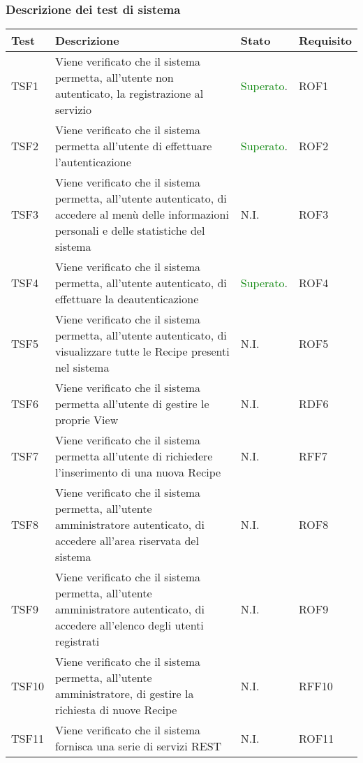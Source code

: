 		\subsubsection{Descrizione dei test di sistema}
			\begin{center}

			\def\arraystretch{1.5}
			\bgroup
			\begin{longtable}{| p{2cm} | p{7cm} | p{1.5cm} | p{2cm} |}
					\hline
					\textbf{Test} & \textbf{Descrizione} & \textbf{Stato} & \textbf{Requisito}\\
					\hline						
					TSF1 & Viene verificato che il sistema permetta, all'utente non autenticato, la registrazione al servizio & \textcolor{green}{Superato}. & ROF1\\
					\hline
					TSF2 & Viene verificato che il sistema permetta all'utente di effettuare l'autenticazione & \textcolor{green}{Superato}. & ROF2\\
					\hline
					TSF3 & Viene verificato che il sistema permetta, all'utente autenticato, di accedere al menù delle informazioni personali e delle statistiche del sistema & N.I. & ROF3\\
					\hline
					TSF4 & Viene verificato che il sistema permetta, all'utente autenticato, di effettuare la deautenticazione & \textcolor{green}{Superato}. & ROF4\\
					\hline
					TSF5 & Viene verificato che il sistema permetta, all'utente autenticato, di visualizzare tutte le Recipe presenti nel sistema & N.I. & ROF5\\
					\hline
					TSF6 & Viene verificato che il sistema permetta all'utente di gestire le proprie View & N.I. & RDF6\\
					\hline
					TSF7 & Viene verificato che il sistema permetta all'utente di richiedere l'inserimento di una nuova Recipe & N.I. & RFF7\\
					\hline
					TSF8 & Viene verificato che il sistema permetta, all'utente amministratore autenticato, di accedere all'area riservata del sistema & N.I. & ROF8\\
					\hline
					TSF9 & Viene verificato che il sistema permetta, all'utente amministratore autenticato, di accedere all'elenco degli utenti registrati & N.I. & ROF9\\
					\hline
					TSF10 & Viene verificato che il sistema permetta, all'utente amministratore, di gestire la richiesta di nuove Recipe & N.I. & RFF10\\
					\hline
					TSF11 & Viene verificato che il sistema fornisca una serie di servizi REST & N.I. & ROF11\\

\end{longtable}
\end{center}
